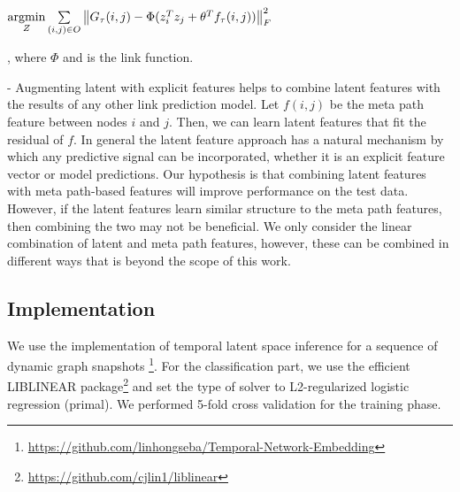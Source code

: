 $ \operatorname*{argmin}\limits_{Z} \sum\limits_{(i,j)\in O} \left \| G_\tau(i,j) - \Phi(z_{i}^Tz_{j} + \theta^Tf_\tau(i,j)) \right \|^2_F $

, where $\Phi$ and is the link function.

- Augmenting latent with explicit features helps to combine latent features with the results of any other link prediction model. Let $f(i,j)$ be the meta path feature between nodes $i$ and $j$. Then, we can learn latent features that fit the residual of $f$. In general the latent feature approach has a natural mechanism by which any predictive signal can be incorporated, whether it is an explicit feature vector or model predictions. Our hypothesis is that combining latent features with meta path-based features will improve performance on the test data. However, if the latent features learn similar structure to the meta path features, then combining the two may not be beneficial. We only consider the linear combination of latent and meta path features, however, these can be combined in different ways that is beyond the scope of this work.

\subsection{Implementation}

We use the implementation of temporal latent space inference for a sequence of dynamic graph snapshots \footnote{\url{https://github.com/linhongseba/Temporal-Network-Embedding}}\cite{Zhu2016}.
 For the classification part, we use the efficient LIBLINEAR \cite{fan2008liblinear} package\footnote{\url{https://github.com/cjlin1/liblinear}} and set the type of solver to L2-regularized logistic regression (primal). %
We performed 5-fold cross validation for the training phase.




